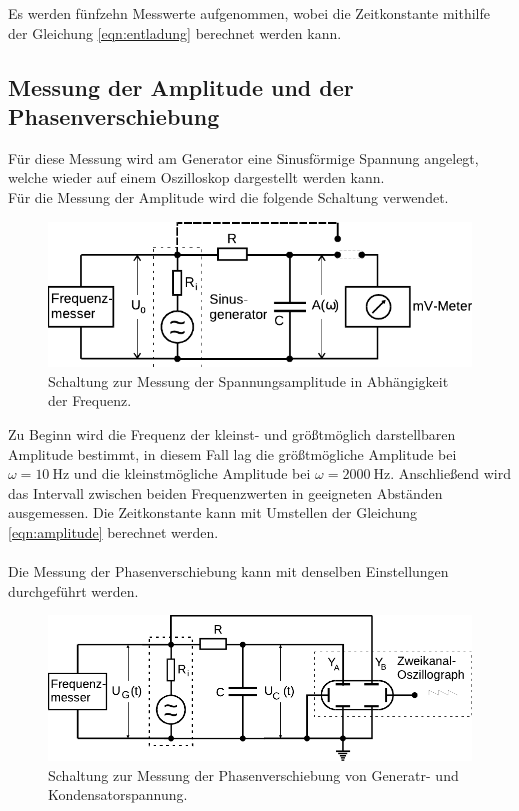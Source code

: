     Es werden fünfzehn Messwerte aufgenommen,
    wobei die Zeitkonstante mithilfe der Gleichung \eqref{eqn:entladung} berechnet werden kann.

\subsection{Messung der Amplitude und der Phasenverschiebung}

    Für diese Messung wird am Generator eine Sinusförmige Spannung angelegt,
    welche wieder auf einem Oszilloskop dargestellt werden kann.\\
    Für die Messung der Amplitude wird die folgende Schaltung verwendet.

    \begin{figure}
        \centering
        \includegraphics{content/img/Abb_5.pdf}
        \caption{Schaltung zur Messung der Spannungsamplitude in Abhängigkeit der Frequenz.}
        \label{fig:messung_amplitude}
    \end{figure}

    Zu Beginn wird die Frequenz der kleinst- und größtmöglich darstellbaren Amplitude bestimmt,
    in diesem Fall lag die größtmögliche Amplitude bei $\omega = \SI{10}{\hertz}$ und die kleinstmögliche Amplitude bei $\omega = \SI{2000}{\hertz}$.
    Anschließend wird das Intervall zwischen beiden Frequenzwerten in geeigneten Abständen ausgemessen.
    Die Zeitkonstante kann mit Umstellen der Gleichung \eqref{eqn:amplitude} berechnet werden.\\
    \\
    Die Messung der Phasenverschiebung kann mit denselben Einstellungen durchgeführt werden.

    \begin{figure}
        \centering
        \includegraphics{content/img/Abb_6.pdf}
        \caption{Schaltung zur Messung der Phasenverschiebung von Generatr- und Kondensatorspannung.}
        \label{fig:messung_phasenverschiebung}
    \end{figure}

